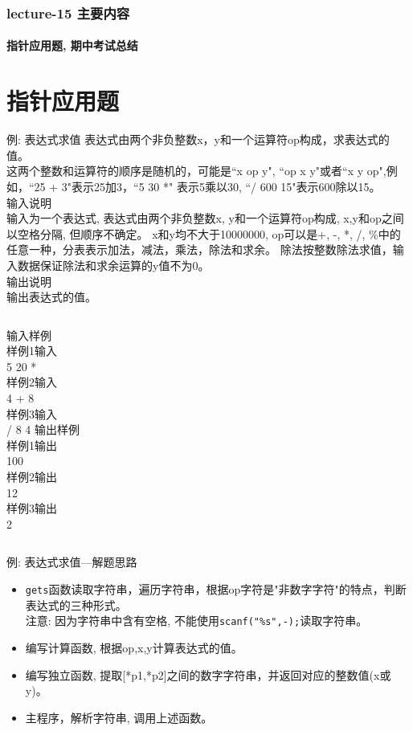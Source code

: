 \begin{frame}[shrink]
  \frametitle{lecture-15 主要内容}
  \framesubtitle{指针应用题, 期中考试总结}
  \tableofcontents
\end{frame}

\section{指针应用题}

\begin{frame}{例: 表达式求值}
表达式由两个非负整数x，y和一个运算符op构成，求表达式的值。\\
这两个整数和运算符的顺序是随机的，可能是``x op y", ``op x y"或者``x y op",例如，``25 + 3"表示25加3，``5 30 *" 表示5乘以30, ``/ 600 15"表示600除以15。\\
输入说明\\	
输入为一个表达式, 表达式由两个非负整数x, y和一个运算符op构成, x,y和op之间以空格分隔, 但顺序不确定。
x和y均不大于10000000, op可以是+, -, *, /, \%中的任意一种，分表表示加法，减法，乘法，除法和求余。
除法按整数除法求值，输入数据保证除法和求余运算的y值不为0。\\
输出说明\\	
输出表达式的值。\\
\medskip
\begin{columns}
	输入样例\\	
	样例1输入\\
	5 20 *\\
	样例2输入\\
	4 + 8\\
	样例3输入\\
	/ 8 4
	输出样例\\	
	样例1输出\\
	100\\
	样例2输出\\
	12\\
	样例3输出\\
	2
\end{columns}
\medskip
\end{frame}

\begin{frame}{例: 表达式求值---解题思路}
\begin{itemize}
	\item \lstinline|gets|函数读取字符串，遍历字符串，根据op字符是"非数字字符"的特点，判断表达式的三种形式。\\
	注意: 因为字符串中含有空格, 不能使用\lstinline|scanf("%s",-);|读取字符串。
	\item 编写计算函数, 根据op,x,y计算表达式的值。
	\item 编写独立函数, 提取[*p1,*p2]之间的数字字符串，并返回对应的整数值(x或y)。
	\item 主程序，解析字符串, 调用上述函数。
\end{itemize}
\end{frame}

